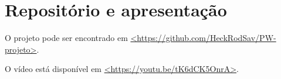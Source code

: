 \section{Repositório e apresentação}

O projeto pode ser encontrado em \href{https://github.com/HeckRodSav/PW-projeto}{<https://github.com/HeckRodSav/PW-projeto>}.

\noindent{}O vídeo está disponível em \href{https://youtu.be/tK6dCK5OnrA}{<https://youtu.be/tK6dCK5OnrA>}.